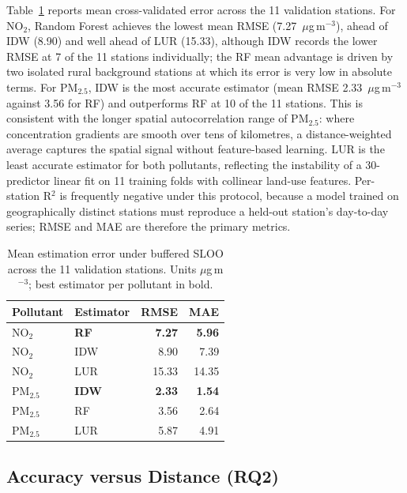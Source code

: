 \documentclass[conference]{IEEEtran}
\begin{document}
Table~\ref{tab:accuracy} reports mean cross-validated error across the 11
validation stations. For NO$_2$, Random Forest achieves the lowest mean RMSE
(7.27~$\mu$g\,m$^{-3}$), ahead of IDW (8.90) and well ahead of LUR (15.33),
although IDW records the lower RMSE at 7 of the 11 stations individually; the
RF mean advantage is driven by two isolated rural background stations at which
its error is very low in absolute terms. For PM$_{2.5}$, IDW is the most
accurate estimator (mean RMSE 2.33~$\mu$g\,m$^{-3}$ against 3.56 for RF) and
outperforms RF at 10 of the 11 stations. This is consistent with the longer
spatial autocorrelation range of PM$_{2.5}$: where concentration gradients are
smooth over tens of kilometres, a distance-weighted average captures the
spatial signal without feature-based learning. LUR is the least accurate
estimator for both pollutants, reflecting the instability of a 30-predictor
linear fit on 11 training folds with collinear land-use features. Per-station
R$^2$ is frequently negative under this protocol, because a model trained on
geographically distinct stations must reproduce a held-out station's
day-to-day series; RMSE and MAE are therefore the primary metrics.

\begin{table}[!ht]
\caption{Mean estimation error under buffered SLOO across the 11 validation
stations. Units $\mu$g\,m$^{-3}$; best estimator per pollutant in bold.}
\label{tab:accuracy}
\centering
\footnotesize
\begin{tabular}{@{}llrr@{}}
\toprule
\textbf{Pollutant} & \textbf{Estimator} & \textbf{RMSE} & \textbf{MAE} \\
\midrule
NO$_2$     & \textbf{RF}  & \textbf{7.27} & \textbf{5.96} \\
NO$_2$     & IDW          & 8.90  & 7.39  \\
NO$_2$     & LUR          & 15.33 & 14.35 \\
\midrule
PM$_{2.5}$ & \textbf{IDW} & \textbf{2.33} & \textbf{1.54} \\
PM$_{2.5}$ & RF           & 3.56  & 2.64  \\
PM$_{2.5}$ & LUR          & 5.87  & 4.91  \\
\bottomrule
\end{tabular}
\end{table}
\FloatBarrier

\subsection{Accuracy versus Distance (RQ2)}
\label{sec:results-rq2}
\end{document}
